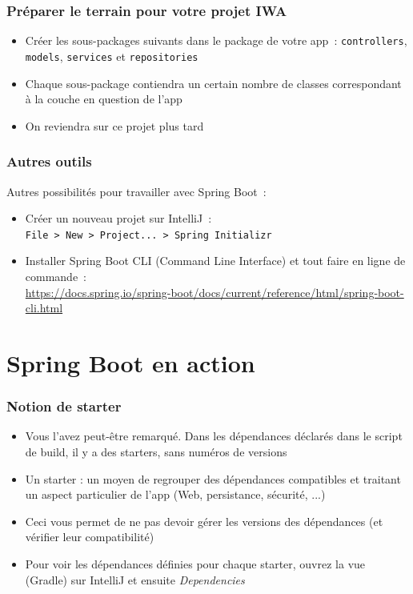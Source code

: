 \documentclass{beamer}
\begin{document}
\begin{frame}
	\frametitle{Préparer le terrain pour votre projet IWA}
	\begin{itemize}
		\item Créer les sous-packages suivants dans le package de votre app~: \texttt{controllers}, \texttt{models}, \texttt{services} et \texttt{repositories}
		\item Chaque sous-package contiendra un certain nombre de classes correspondant à la couche en question de l'app
		\item On reviendra sur ce projet plus tard
	\end{itemize}
\end{frame}

\begin{frame}
	\frametitle{Autres outils}
	Autres possibilités pour travailler avec Spring Boot~:
	\begin{itemize}
\item Créer un nouveau projet sur IntelliJ~:\\ \texttt{File > New > Project... > Spring Initializr}
\item Installer Spring Boot CLI (Command Line Interface) et tout faire en ligne de commande~:\\
\footnotesize
\url{https://docs.spring.io/spring-boot/docs/current/reference/html/spring-boot-cli.html}
\normalsize
\end{itemize}
\end{frame}



\section{Spring Boot en action}

\begin{frame}
  \frametitle{Notion de starter}
  \begin{itemize}
  \item Vous l'avez peut-être remarqué. Dans les dépendances déclarés dans le script de build, il y a des starters, sans numéros de versions
  \item Un starter : un moyen de regrouper des dépendances compatibles et traitant un aspect particulier de l'app (Web, persistance, sécurité, ...)
  \item Ceci vous permet de ne pas devoir gérer les versions des dépendances (et vérifier leur compatibilité)
  \item Pour voir les dépendances définies pour chaque starter, ouvrez la vue (Gradle) sur IntelliJ et ensuite \textit{Dependencies}
  
  \end{itemize}
\end{frame}
\end{document}
